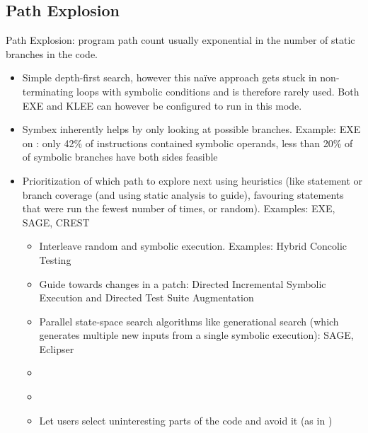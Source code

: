 \documentclass{article}
\begin{document}
\begin{multicols}{2}
    \subsection{Path Explosion}
    Path Explosion: program path count usually exponential in the number of static branches in the code.
    \begin{itemize}
        \item Simple depth-first search, however this naïve approach gets stuck in non-terminating loops with symbolic conditions and is therefore rarely used. Both EXE\cite{EXE} and KLEE\cite{KLEE} can however be configured to run in this mode.
        \item Symbex inherently helps by only looking at possible branches. Example: EXE\cite{EXE} on : only 42\% of instructions contained symbolic operands, less than 20\% of of symbolic branches have both sides feasible\cite{EXE}
        \item Prioritization of which path to explore next using heuristics (like statement or branch coverage (and using static analysis to guide), favouring statements that were run the fewest number of times, or random). Examples: EXE\cite{EXE}, SAGE\cite{SAGE}, CREST\cite{CREST}
              \begin{itemize}
                  \item Interleave random and symbolic execution. Examples: Hybrid Concolic Testing\cite{HCT, Driller, Cyberdyne}
                  \item Guide towards changes in a patch: Directed Incremental Symbolic Execution\cite{DiSE} and Directed Test Suite Augmentation\cite{DTSA}
                  \item Parallel state-space search algorithms like generational search (which generates multiple new inputs from a single symbolic execution): SAGE\cite{SAGE}, Eclipser\cite{Eclipser}
                  \item {}\cite{ReviewThreeDecades}
                  \item {}\cite{Fitnex}
                  \item Let users select uninteresting parts of the code and avoid it (as in \cite{Chopped})

\end{itemize}
\end{itemize}
\end{multicols}
\end{document}
